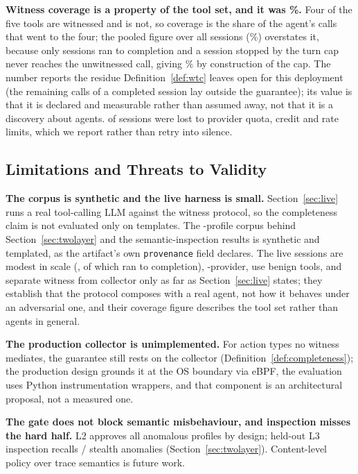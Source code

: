 \documentclass[letterpaper,10pt,twocolumn]{article}
\theoremstyle{definition}
\begin{document}
\textbf{Witness coverage is a property of the tool set, and it was
\liveCoverageCompleted\%.} Four of the five tools are witnessed and
\texttt{\liveUnmediated} is not, so coverage is the share of the agent's calls
that went to the four; the pooled figure over all \liveSessions{} sessions (\liveCoverageMean\%) overstates it, because only \liveCompleted{} sessions
ran to completion and a session stopped by the turn cap never reaches the
unwitnessed call, giving \liveCoverageTruncated\% by construction of the cap.
The number reports the residue Definition~\ref{def:wtc} leaves open for this
deployment (the remaining calls of a completed session lay outside the
guarantee); its value is that it is declared and measurable rather than assumed
away, not that it is a discovery about agents. \liveFailures{} of
\liveRequested{} sessions were lost to provider quota, credit and rate limits,
which we report rather than retry into silence.

\subsection{Limitations and Threats to Validity}\label{sec:limitations}
\textbf{The corpus is synthetic and the live harness is small.} Section~\ref{sec:live} runs a real tool-calling LLM against the witness protocol, so the completeness claim is not evaluated only on templates. The \corpusProfiles-profile corpus behind Section~\ref{sec:twolayer} and the semantic-inspection results is synthetic and templated, as the artifact's own \texttt{provenance} field declares. The live sessions are modest in scale (\liveSessions{}, of which \liveCompleted{} ran to completion), \liveProviderCount{}-provider, use benign tools, and separate witness from collector only as far as Section~\ref{sec:live} states; they establish that the protocol composes with a real agent, not how it behaves under an adversarial one, and their coverage figure describes the tool set rather than agents in general.

\textbf{The production collector is unimplemented.} For action types no witness mediates, the guarantee still rests on the collector (Definition~\ref{def:completeness}); the production design grounds it at the OS boundary via eBPF, the evaluation uses Python instrumentation wrappers, and that component is an architectural proposal, not a measured one.

\textbf{The gate does not block semantic misbehaviour, and inspection misses the hard half.} L2 approves all \insRecallN{} anomalous profiles by design; held-out L3 inspection recalls \insStealthK/\insStealthN{} stealth anomalies (Section~\ref{sec:twolayer}). Content-level policy over trace semantics is future work.
\end{document}
